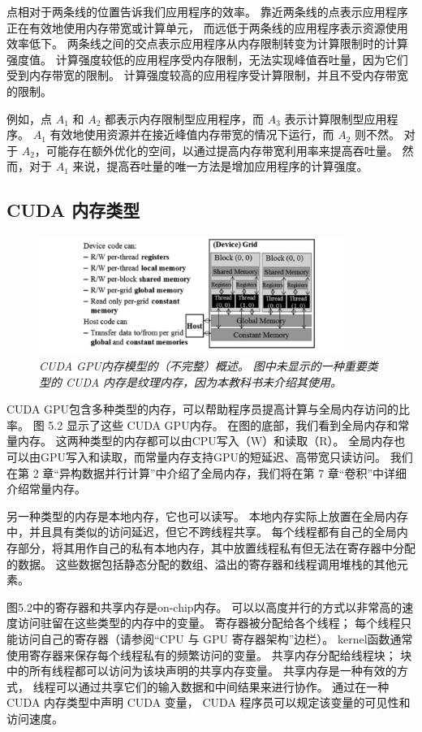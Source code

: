 \begin{remark}[Roofline 模型]
点相对于两条线的位置告诉我们应用程序的效率。 靠近两条线的点表示应用程序正在有效地使用内存带宽或计算单元，
而远低于两条线的应用程序表示资源使用效率低下。 两条线之间的交点表示应用程序从内存限制转变为计算限制时的计算强度值。 
计算强度较低的应用程序受内存限制，无法实现峰值吞吐量，因为它们受到内存带宽的限制。 
计算强度较高的应用程序受计算限制，并且不受内存带宽的限制。

例如，点 $A_1$ 和 $A_2$ 都表示内存限制型应用程序，而 $A_3$ 表示计算限制型应用程序。 
$A_1$ 有效地使用资源并在接近峰值内存带宽的情况下运行，而 $A_2$ 则不然。 
对于 $A_2$，可能存在额外优化的空间，以通过提高内存带宽利用率来提高吞吐量。 
然而，对于 $A_1$ 来说，提高吞吐量的唯一方法是增加应用程序的计算强度。
\end{remark}

\subsection{CUDA 内存类型}
\begin{figure}[H]
	\centering
	\includegraphics[width=0.9\textwidth]{figs/F5.2.png}
	\caption{\textit{CUDA GPU内存模型的（不完整）概述。 
	图中未显示的一种重要类型的 CUDA 内存是纹理内存，因为本教科书未介绍其使用。}}
\end{figure}

CUDA GPU包含多种类型的内存，可以帮助程序员提高计算与全局内存访问的比率。 图 5.2 显示了这些 CUDA GPU内存。 
在图的底部，我们看到全局内存和常量内存。 这两种类型的内存都可以由CPU写入（W）和读取（R）。 
全局内存也可以由GPU写入和读取，而常量内存支持GPU的短延迟、高带宽只读访问。 
我们在第 2 章“异构数据并行计算”中介绍了全局内存，我们将在第 7 章“卷积”中详细介绍常量内存。

另一种类型的内存是本地内存，它也可以读写。 本地内存实际上放置在全局内存中，并且具有类似的访问延迟，但它不跨线程共享。 
每个线程都有自己的全局内存部分，将其用作自己的私有本地内存，其中放置线程私有但无法在寄存器中分配的数据。 
这些数据包括静态分配的数组、溢出的寄存器和线程调用堆栈的其他元素。

图5.2中的寄存器和共享内存是on-chip内存。 可以以高度并行的方式以非常高的速度访问驻留在这些类型的内存中的变量。 
寄存器被分配给各个线程； 每个线程只能访问自己的寄存器（请参阅“CPU 与 GPU 寄存器架构”边栏）。 
kernel函数通常使用寄存器来保存每个线程私有的频繁访问的变量。 共享内存分配给线程块； 
块中的所有线程都可以访问为该块声明的共享内存变量。 共享内存是一种有效的方式，
线程可以通过共享它们的输入数据和中间结果来进行协作。 通过在一种 CUDA 内存类型中声明 CUDA 变量，
CUDA 程序员可以规定该变量的可见性和访问速度。

